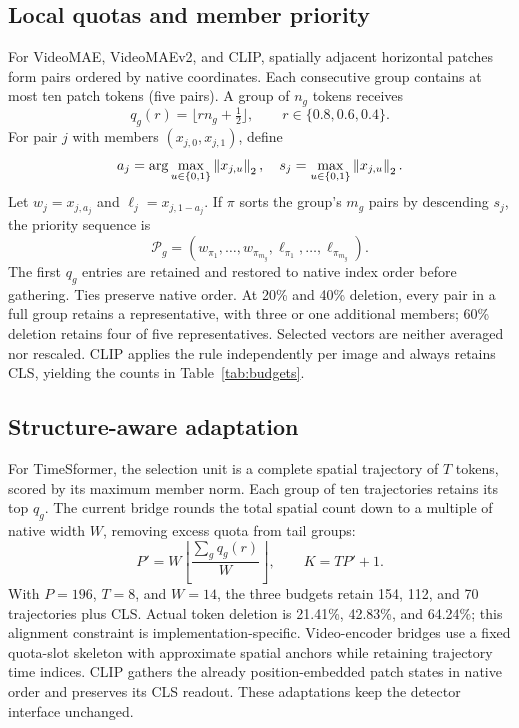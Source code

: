 \subsection{Local quotas and member priority}
For VideoMAE, VideoMAEv2, and CLIP, spatially adjacent horizontal patches form pairs ordered by native coordinates. Each consecutive group contains at most ten patch tokens (five pairs). A group of $n_g$ tokens receives
\begin{equation}
 q_g(r)=\lfloor rn_g+\tfrac12\rfloor,
 \qquad r\in\{0.8,0.6,0.4\}.
 \label{eq:quota}
\end{equation}
For pair $j$ with members $(x_{j,0},x_{j,1})$, define
\begin{equation}
 a_j=\arg\max_{u\in\{0,1\}}\left\lVert x_{j,u}\right\rVert_2,\quad
 s_j=\max_{u\in\{0,1\}}\left\lVert x_{j,u}\right\rVert_2.
 \label{eq:score}
\end{equation}
Let $w_j=x_{j,a_j}$ and $\ell_j=x_{j,1-a_j}$. If $\pi$ sorts the group's $m_g$ pairs by descending $s_j$, the priority sequence is
\begin{equation}
 \mathcal P_g=(w_{\pi_1},\ldots,w_{\pi_{m_g}},
                 \ell_{\pi_1},\ldots,\ell_{\pi_{m_g}}).
 \label{eq:priority}
\end{equation}
The first $q_g$ entries are retained and restored to native index order before gathering. Ties preserve native order. At 20\% and 40\% deletion, every pair in a full group retains a representative, with three or one additional members; 60\% deletion retains four of five representatives. Selected vectors are neither averaged nor rescaled. CLIP applies the rule independently per image and always retains CLS, yielding the counts in Table~\ref{tab:budgets}.

\subsection{Structure-aware adaptation}
For TimeSformer, the selection unit is a complete spatial trajectory of $T$ tokens, scored by its maximum member norm. Each group of ten trajectories retains its top $q_g$. The current bridge rounds the total spatial count down to a multiple of native width $W$, removing excess quota from tail groups:
\begin{equation}
 P'=W\left\lfloor\frac{\sum_g q_g(r)}{W}\right\rfloor,
 \qquad K=TP'+1.
 \label{eq:trajectory}
\end{equation}
With $P=196$, $T=8$, and $W=14$, the three budgets retain 154, 112, and 70 trajectories plus CLS. Actual token deletion is 21.41\%, 42.83\%, and 64.24\%; this alignment constraint is implementation-specific. Video-encoder bridges use a fixed quota-slot skeleton with approximate spatial anchors while retaining trajectory time indices. CLIP gathers the already position-embedded patch states in native order and preserves its CLS readout. These adaptations keep the detector interface unchanged.
